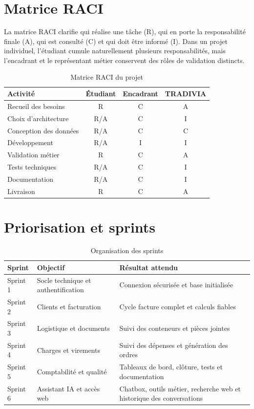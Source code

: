 \documentclass[12pt,a4paper,oneside]{report}
\begin{document}
\section{Matrice RACI}
La matrice RACI clarifie qui réalise une tâche (R), qui en porte la responsabilité finale (A), qui est consulté (C) et qui doit être informé (I). Dans un projet individuel, l'étudiant cumule naturellement plusieurs responsabilités, mais l'encadrant et le représentant métier conservent des rôles de validation distincts.

\begin{table}[H]\centering
\caption{Matrice RACI du projet}
\begin{tabularx}{\textwidth}{Y c c c}
\toprule \textbf{Activité} & \textbf{Étudiant} & \textbf{Encadrant} & \textbf{TRADIVIA}\\ \midrule
Recueil des besoins & R & C & A\\
Choix d'architecture & R/A & C & I\\
Conception des données & R/A & C & C\\
Développement & R/A & I & I\\
Validation métier & R & C & A\\
Tests techniques & R/A & C & I\\
Documentation & R/A & C & I\\
Livraison & R & C & A\\
\bottomrule
\end{tabularx}
\end{table}

\section{Priorisation et sprints}
\begin{table}[H]\centering
\caption{Organisation des sprints}
\begin{tabularx}{\textwidth}{p{2cm}Y Y}
\toprule \textbf{Sprint} & \textbf{Objectif} & \textbf{Résultat attendu}\\ \midrule
Sprint 1 & Socle technique et authentification & Connexion sécurisée et base initialisée\\
Sprint 2 & Clients et facturation & Cycle facture complet et calculs fiables\\
Sprint 3 & Logistique et documents & Suivi des conteneurs et pièces jointes\\
Sprint 4 & Charges et virements & Suivi des dépenses et génération des ordres\\
Sprint 5 & Comptabilité et qualité & Tableaux de bord, clôture, tests et documentation\\
Sprint 6 & Assistant IA et accès web & Chatbox, outils métier, recherche web et historique des conversations\\
\bottomrule
\end{tabularx}
\end{table}
\end{document}
